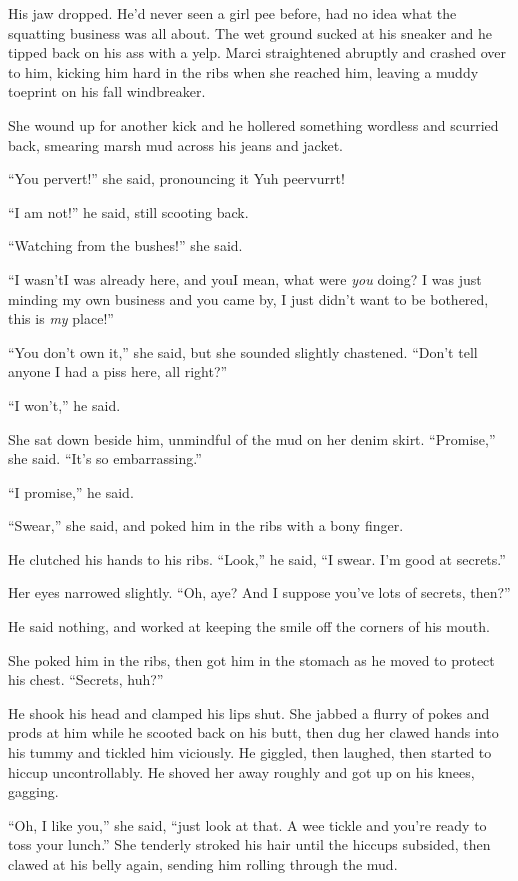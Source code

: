 His jaw dropped.  He'd never seen a girl pee before, had no idea what
the squatting business was all about.  The wet ground sucked at his
sneaker and he tipped back on his ass with a yelp.  Marci straightened
abruptly and crashed over to him, kicking him hard in the ribs when
she reached him, leaving a muddy toeprint on his fall windbreaker.

She wound up for another kick and he hollered something wordless and
scurried back, smearing marsh mud across his jeans and jacket.

``You pervert!'' she said, pronouncing it Yuh peervurrt!

``I am not!'' he said, still scooting back.

``Watching from the bushes!'' she said.

``I wasn't\dash{}I was already here, and you\dash{}I mean, what were
\textit{you} doing?  I was just minding my own business and you came
by, I just didn't want to be bothered, this is \textit{my} place!''

``You don't own it,'' she said, but she sounded slightly chastened. 
``Don't tell anyone I had a piss here, all right?''

``I won't,'' he said.

She sat down beside him, unmindful of the mud on her denim skirt. 
``Promise,'' she said.  ``It's so embarrassing.''

``I promise,'' he said.

``Swear,'' she said, and poked him in the ribs with a bony finger.

He clutched his hands to his ribs.  ``Look,'' he said, ``I swear.  I'm
good at secrets.''

Her eyes narrowed slightly.  ``Oh, aye?  And I suppose you've lots of
secrets, then?''

He said nothing, and worked at keeping the smile off the corners of
his mouth.

She poked him in the ribs, then got him in the stomach as he moved to
protect his chest.  ``Secrets, huh?''

He shook his head and clamped his lips shut.  She jabbed a flurry of
pokes and prods at him while he scooted back on his butt, then dug her
clawed hands into his tummy and tickled him viciously.  He giggled,
then laughed, then started to hiccup uncontrollably.  He shoved her
away roughly and got up on his knees, gagging.

``Oh, I like you,'' she said, ``just look at that.  A wee tickle and
you're ready to toss your lunch.'' She tenderly stroked his hair until
the hiccups subsided, then clawed at his belly again, sending him
rolling through the mud.

